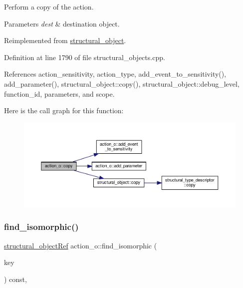 Perform a copy of the action. 


\begin{DoxyParams}{Parameters}
{\em dest} & destination object. \\
\hline
\end{DoxyParams}


Reimplemented from \hyperlink{classstructural__object_a6566435c67934f6b4ff1b319c0682b18}{structural\+\_\+object}.



Definition at line 1790 of file structural\+\_\+objects.\+cpp.



References action\+\_\+sensitivity, action\+\_\+type, add\+\_\+event\+\_\+to\+\_\+sensitivity(), add\+\_\+parameter(), structural\+\_\+object\+::copy(), structural\+\_\+object\+::debug\+\_\+level, function\+\_\+id, parameters, and scope.

Here is the call graph for this function\+:
\nopagebreak
\begin{figure}[H]
\begin{center}
\leavevmode
\includegraphics[width=350pt]{d2/ded/classaction__o_ad43a70b3b57e4ce60508ad0ee04396ff_cgraph}
\end{center}
\end{figure}
\mbox{\label{classaction__o_aeda1f184bbdd2210b45361a5da845b85}} 
\subsubsection{\texorpdfstring{find\+\_\+isomorphic()}{find\_isomorphic()}}
{\footnotesize\ttfamily \hyperlink{structural__objects_8hpp_a8ea5f8cc50ab8f4c31e2751074ff60b2}{structural\+\_\+object\+Ref} action\+\_\+o\+::find\+\_\+isomorphic (\begin{DoxyParamCaption}\item[{const \hyperlink{structural__objects_8hpp_a8ea5f8cc50ab8f4c31e2751074ff60b2}{structural\+\_\+object\+Ref}}]{key }\end{DoxyParamCaption}) const\hspace{0.3cm}{\ttfamily [override]}, {\ttfamily [virtual]}}




